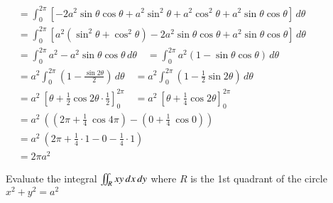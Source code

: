 \documentclass[11pt]{extarticle}
\newcommand{\dx}{{\,dx}}
\newcommand{\dy}{{\,dy}}
\newcommand{\dtheta}{{\,d\theta}}
\newcommand{\miint}{\iint\displaylimits}
\begin{document}
$\begin{aligned}
   & =\int_0^{2\pi} \left[-2 a^2 \sin \theta \cos \theta+{a^2 \sin ^2 \theta} + {a^2 \cos^2 \theta}+a^2 \sin \theta \cos \theta\right]\dtheta\\[1ex]
   & =\int_0^{2\pi} \left[a^2 \left(\sin ^2 \theta + \cos^2 \theta\right)-2 a^2 \sin \theta \cos \theta+a^2 \sin \theta \cos \theta\right]\dtheta\\[1ex]
   & =\int_0^{2\pi} a^2 - a^2 \sin \theta \cos \theta\dtheta
   \quad =\int_0^{2\pi} a^2 \left(1 - \sin\theta\cos\theta\right)\dtheta\\[1ex]
   & = a^2 \int_0^{2\pi} \left(1 - \frac{\sin2\theta}{2}\right)\dtheta
   \quad = a^2 \int_0^{2\pi} \left(1 - \frac{1}{2}\sin2\theta\right)\dtheta\\[1ex]
   & = a^2 \ \left[\theta + \frac{1}{2}\cos2\theta\cdot\frac{1}{2}\right]_0^{2\pi} 
   \quad = a^2 \ \left[\theta + \frac{1}{4}\cos2\theta\right]_0^{2\pi}\\[1ex]
   & = a^2 \ \left(\left(2\pi + \frac{1}{4} \ \cos4\pi\right)-\left(0 + \frac{1}{4} \ \cos0\right)\right)\\[1ex]
   & = a^2 \ \left(2\pi + \frac{1}{4}\cdot 1-0 - \frac{1}{4}\cdot 1\right)\\
   & = 2\pi a^2
\end{aligned}$


\pagebreak
\textbf{} Evaluate the integral $\miint_R xy\dx\dy$ where $R$ is the 1st quadrant of the circle $x^2+y^2=a^2$
\end{document}
